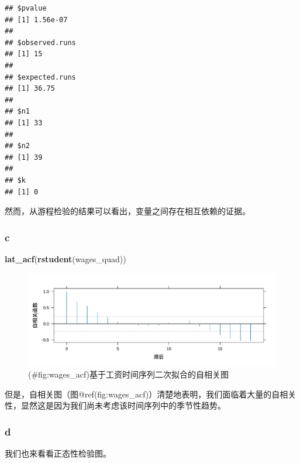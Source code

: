 \documentclass[
]{article}
\newenvironment{Shaded}{\begin{snugshade}}{\end{snugshade}}
\newcommand{\FunctionTok}[1]{\textcolor[rgb]{0.13,0.29,0.53}{\textbf{#1}}}
\newcommand{\NormalTok}[1]{#1}
\begin{document}
\begin{verbatim}
## $pvalue
## [1] 1.56e-07
## 
## $observed.runs
## [1] 15
## 
## $expected.runs
## [1] 36.75
## 
## $n1
## [1] 33
## 
## $n2
## [1] 39
## 
## $k
## [1] 0
\end{verbatim}

然而，从游程检验的结果可以看出，变量之间存在相互依赖的证据。

\hypertarget{c-4}{%
\subsubsection*{c}\label{c-4}}

\begin{Shaded}
\begin{Highlighting}[]
\FunctionTok{lat\_acf}\NormalTok{(}\FunctionTok{rstudent}\NormalTok{(wages\_quad))}
\end{Highlighting}
\end{Shaded}

\begin{figure}
\centering
\includegraphics{chapter3_files/figure-latex/wages_acf-1.pdf}
\caption{(\#fig:wages\_acf)基于工资时间序列二次拟合的自相关图}
\end{figure}

但是，自相关图（图@ref(fig:wages\_acf)）清楚地表明，我们面临着大量的自相关性，显然这是因为我们尚未考虑该时间序列中的季节性趋势。

\hypertarget{d-4}{%
\subsubsection*{d}\label{d-4}}

我们也来看看正态性检验图。
\end{document}
